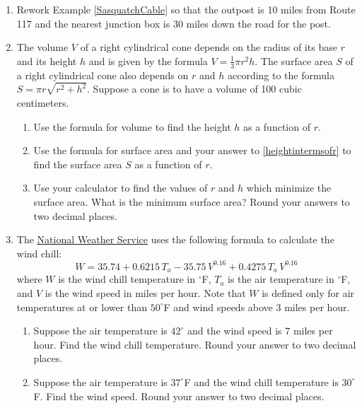 \begin{enumerate}
\setcounter{enumi}{\value{HW}}

\item  Rework Example \ref{SasquatchCable} so that the outpost is 10 miles from Route 117 and the nearest junction box is 30 miles down the road for the post.


\item  The volume $V$ of a right cylindrical cone depends on the radius of its base $r$ and its height $h$ and is given by the formula $V = \frac{1}{3} \pi r^2 h$.  The surface area $S$ of a right cylindrical cone also depends on $r$ and $h$ according to the formula $S = \pi r \sqrt{r^2+h^2}$.  Suppose a cone is to have a volume of 100 cubic centimeters. 

\begin{enumerate}

\item  \label{heightintermsofr} Use the formula for volume to find the height $h$ as a function of $r$.
\item  Use the formula for surface area and your answer to \ref{heightintermsofr} to find the surface area $S$ as a function of $r$.
\item  Use your calculator to find the values of $r$ and $h$ which minimize the surface area.  What is the minimum surface area?  Round your answers to two decimal places.

\end{enumerate}

\item \label{WindChillTemperature} The \href{http://www.nws.noaa.gov/om/windchill/windchillglossary.shtml}{\underline{National Weather Service}} uses the following formula to calculate the wind chill: \[ W = 35.74 + 0.6215 \, T_{a} - 35.75\, V^{0.16} + 0.4275 \, T_{a} \, V^{0.16}  \] where $W$ is the wind chill temperature in $^{\circ}$F, $T_{a}$ is the air temperature in $^{\circ}$F, and  $V$ is the wind speed in miles per hour.  Note that $W$ is defined only for air temperatures at or lower than $50^{\circ}$F and wind speeds above $3$ miles per hour.

\begin{enumerate}

\item  Suppose the air temperature is $42^{\circ}$ and the wind speed is $7$ miles per hour. Find the wind chill temperature.  Round your answer to two decimal places.

\item  Suppose the air temperature is $37^{\circ}$F and the wind chill temperature is $30^{\circ}$F.  Find the wind speed.  Round your answer to two decimal places. 


\end{enumerate}
\end{enumerate}
